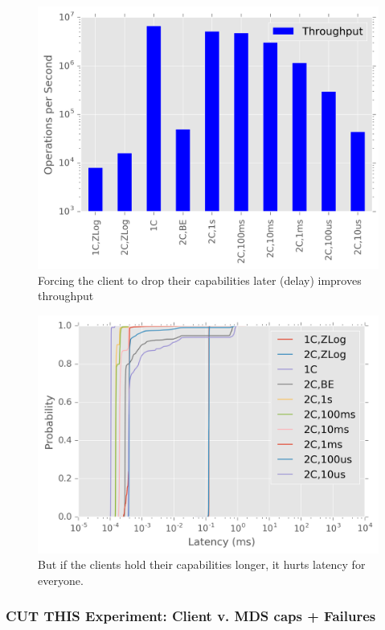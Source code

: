 \documentclass[10pt,twocolumn]{article}
\begin{document}
\begin{figure}[htbp]
\centering
\includegraphics{figures/caps-delay-thruput.png}
\caption{Forcing the client to drop their capabilities later (delay)
improves throughput}
\end{figure}

\begin{figure}[htbp]
\centering
\includegraphics{figures/caps-delay-latency.png}
\caption{But if the clients hold their capabilities longer, it hurts
latency for everyone.}
\end{figure}

\subsubsection{CUT THIS Experiment: Client v. MDS caps +
Failures}\label{cut-this-experiment-client-v.-mds-caps-failures}
\end{document}
